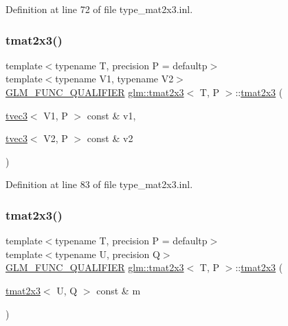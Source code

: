 Definition at line 72 of file type\+\_\+mat2x3.\+inl.

\mbox{\label{structglm_1_1tmat2x3_a4cb1b9991bfa8f25e56a637081d4ee67}} 
\subsubsection{\texorpdfstring{tmat2x3()}{tmat2x3()}\hspace{0.1cm}{\footnotesize\ttfamily [21/22]}}
{\footnotesize\ttfamily template$<$typename T, precision P = defaultp$>$ \\
template$<$typename V1, typename V2$>$ \\
\mbox{\hyperlink{setup_8hpp_a33fdea6f91c5f834105f7415e2a64407}{G\+L\+M\+\_\+\+F\+U\+N\+C\+\_\+\+Q\+U\+A\+L\+I\+F\+I\+ER}} \mbox{\hyperlink{structglm_1_1tmat2x3}{glm\+::tmat2x3}}$<$ T, P $>$\+::\mbox{\hyperlink{structglm_1_1tmat2x3}{tmat2x3}} (\begin{DoxyParamCaption}\item[{\mbox{\hyperlink{structglm_1_1tvec3}{tvec3}}$<$ V1, P $>$ const \&}]{v1,  }\item[{\mbox{\hyperlink{structglm_1_1tvec3}{tvec3}}$<$ V2, P $>$ const \&}]{v2 }\end{DoxyParamCaption})}



Definition at line 83 of file type\+\_\+mat2x3.\+inl.

\mbox{\label{structglm_1_1tmat2x3_a9a042a9919399f8eed6946601dbb79da}} 
\subsubsection{\texorpdfstring{tmat2x3()}{tmat2x3()}\hspace{0.1cm}{\footnotesize\ttfamily [22/22]}}
{\footnotesize\ttfamily template$<$typename T, precision P = defaultp$>$ \\
template$<$typename U, precision Q$>$ \\
\mbox{\hyperlink{setup_8hpp_a33fdea6f91c5f834105f7415e2a64407}{G\+L\+M\+\_\+\+F\+U\+N\+C\+\_\+\+Q\+U\+A\+L\+I\+F\+I\+ER}} \mbox{\hyperlink{structglm_1_1tmat2x3}{glm\+::tmat2x3}}$<$ T, P $>$\+::\mbox{\hyperlink{structglm_1_1tmat2x3}{tmat2x3}} (\begin{DoxyParamCaption}\item[{\mbox{\hyperlink{structglm_1_1tmat2x3}{tmat2x3}}$<$ U, Q $>$ const \&}]{m }\end{DoxyParamCaption})}



